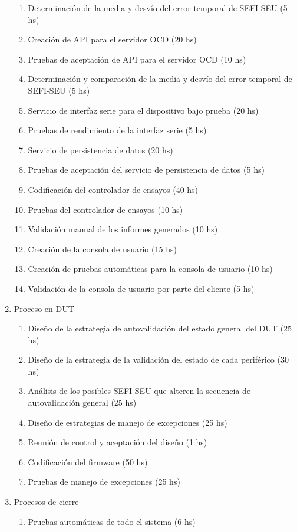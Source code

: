 \documentclass[
11pt, %
]{charter}
\begin{document}
\begin{enumerate}
\begin{enumerate}
	\item Determinación de la media y desvío del error temporal de SEFI-SEU (5 hs)
	\item Creación de API para el servidor OCD (20 hs)
	\item Pruebas de aceptación de API para el servidor OCD (10 hs)
	\item Determinación y comparación de la media y desvío del error temporal de SEFI-SEU (5 hs)
	\item Servicio de interfaz serie para el dispositivo bajo prueba (20 hs)
	\item Pruebas de rendimiento de la interfaz serie (5 hs)
	\item Servicio de persistencia de datos (20 hs)
	\item Pruebas de aceptación del servicio de persistencia de datos (5 hs)
	\item Codificación del controlador de ensayos (40 hs)
	\item Pruebas del controlador de ensayos (10 hs)
	\item Validación manual de los informes generados (10 hs)
	\item Creación de la consola de usuario (15 hs)
	\item Creación de pruebas automáticas para la consola de usuario (10 hs)
	\item Validación de la consola de usuario por parte del cliente (5 hs)
	\end{enumerate}
\item Proceso en DUT
	\begin{enumerate}
		\item Diseño de la estrategia de autovalidación del estado general del DUT (25 hs)
		\item Diseño de la estrategia de la validación del estado de cada periférico (30 hs)
		\item Análisis de los posibles SEFI-SEU que alteren la secuencia de autovalidación general (25 hs)
		\item Diseño de estrategias de manejo de excepciones (25 hs)
		\item Reunión de control y aceptación del diseño (1 hs)
		\item Codificación del firmware (50 hs)
		\item Pruebas de manejo de excepciones (25 hs)
	\end{enumerate}
\item Procesos de cierre
	\begin{enumerate}
		\item Pruebas automáticas de todo el sistema (6 hs)

\end{enumerate}
\end{enumerate}
\end{document}
